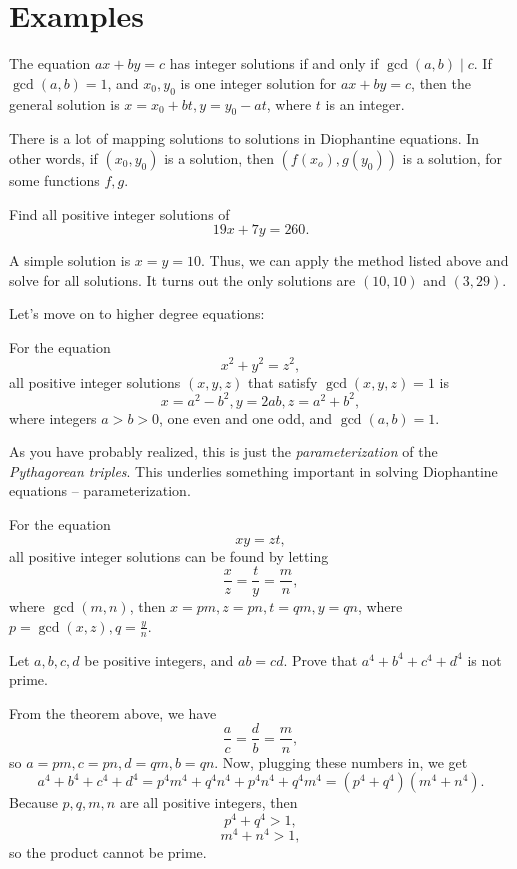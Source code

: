 \documentclass[mast]{lucky}
\begin{document}
\section{Examples}
\begin{theo} 
The equation $ax+by=c$ has integer solutions if and only if $\gcd(a,b) \mid c$. If $\gcd(a,b) = 1$, and $x_0,y_0$ is one integer solution for $ax+by=c$, then the general solution is $x=x_0+bt,y=y_0-at$, where $t$ is an integer.
\end{theo}
There is a lot of mapping solutions to solutions in Diophantine equations. In other words, if $(x_0,y_0)$ is a solution, then $(f(x_o),g(y_0))$ is a solution, for some functions $f,g$.
\begin{exam}
Find all positive integer solutions of
$$19x+7y=260.$$
\end{exam}
\begin{sol}
A simple solution is $x=y=10$. Thus, we can apply the method listed above and solve for all solutions. It turns out the only solutions are $(10,10)$ and $(3,29)$. 
\end{sol}
Let's move on to higher degree equations:
\begin{theo} 
For the equation
$$x^2+y^2=z^2,$$
all positive integer solutions $(x,y,z)$ that satisfy $\gcd(x,y,z)=1$ is 
$$x=a^2-b^2,y=2ab,z=a^2+b^2,$$
where integers $a>b>0$, one even and one odd, and $\gcd(a,b)=1$.
\end{theo}
As you have probably realized, this is just the \emph{parameterization} of the \emph{Pythagorean triples}. This underlies something important in solving Diophantine equations -- parameterization. 
\begin{theo} 
For the equation
$$xy=zt,$$
all positive integer solutions can be found by letting
$$\frac{x}{z} = \frac{t}{y} = \frac{m}{n},$$
where $\gcd(m,n)$, then $x=pm,z=pn,t=qm,y=qn$, where $p=\gcd(x,z),q=\frac{y}{n}$. 
\end{theo}
\begin{exam}
Let $a,b,c,d$ be positive integers, and $ab=cd$. Prove that $a^4+b^4+c^4+d^4$ is not prime.
\end{exam}
\begin{sol}
From the theorem above, we have
$$\frac{a}{c} = \frac{d}{b} = \frac{m}{n},$$
so $a=pm,c=pn,d=qm,b=qn$. Now, plugging these numbers in, we get
$$a^4+b^4+c^4+d^4 = p^4m^4 + q^4n^4 + p^4n^4 + q^4m^4 = (p^4 + q^4)(m^4+n^4).$$
Because $p,q,m,n$ are all positive integers, then 
$$p^4+q^4>1,$$
$$m^4+n^4>1,$$
so the product cannot be prime.
\end{sol}
\end{document}
